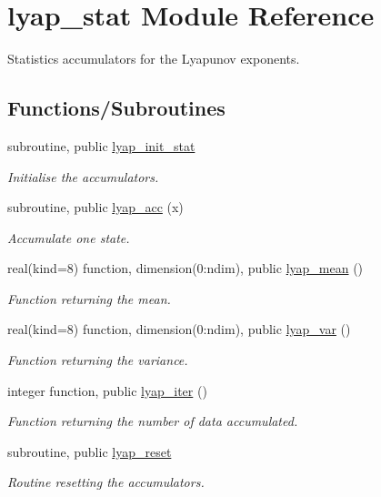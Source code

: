 \hypertarget{namespacelyap__stat}{}\section{lyap\+\_\+stat Module Reference}
\label{namespacelyap__stat}


Statistics accumulators for the Lyapunov exponents.  


\subsection*{Functions/\+Subroutines}
\begin{DoxyCompactItemize}
\item 
subroutine, public \hyperlink{namespacelyap__stat_a0db1853a990b21e68d094e08e9786271}{lyap\+\_\+init\+\_\+stat}
\begin{DoxyCompactList}\small\item\em Initialise the accumulators. \end{DoxyCompactList}\item 
subroutine, public \hyperlink{namespacelyap__stat_ae5925eda9d281c9f5d3b5bf51a342d75}{lyap\+\_\+acc} (x)
\begin{DoxyCompactList}\small\item\em Accumulate one state. \end{DoxyCompactList}\item 
real(kind=8) function, dimension(0\+:ndim), public \hyperlink{namespacelyap__stat_a05e8e9da3a46e83279e088b44f940d6e}{lyap\+\_\+mean} ()
\begin{DoxyCompactList}\small\item\em Function returning the mean. \end{DoxyCompactList}\item 
real(kind=8) function, dimension(0\+:ndim), public \hyperlink{namespacelyap__stat_a74c10391cac36f4ea668a2ab24047eca}{lyap\+\_\+var} ()
\begin{DoxyCompactList}\small\item\em Function returning the variance. \end{DoxyCompactList}\item 
integer function, public \hyperlink{namespacelyap__stat_a455a24b2f34307a219de05297857d216}{lyap\+\_\+iter} ()
\begin{DoxyCompactList}\small\item\em Function returning the number of data accumulated. \end{DoxyCompactList}\item 
subroutine, public \hyperlink{namespacelyap__stat_a464af579adb8b49dcd16abc1e251e1bc}{lyap\+\_\+reset}
\begin{DoxyCompactList}\small\item\em Routine resetting the accumulators. \end{DoxyCompactList}\end{DoxyCompactItemize}
